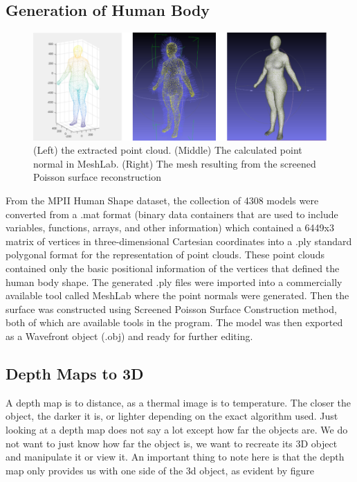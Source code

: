 \documentclass{article}
\begin{document}
    \subsection{Generation of Human Body}
    
    \begin{figure}[h]
        \centering
        \includegraphics{images/humanModel.png}
        \caption{(Left) the extracted point cloud. (Middle) The calculated point normal in MeshLab. (Right) The mesh resulting from the screened Poisson surface reconstruction}
        \label{(Left) the extracted point cloud. (Middle) The calculated point normal in MeshLab. (Right) The mesh resulting from the screened Poisson surface reconstruction(Left) the extracted point cloud. (Middle) The calculated point normal in MeshLab. (Right) The mesh resulting from the screened Poisson surface reconstruction}
    \end{figure}
    From the MPII Human Shape dataset, the collection of 4308 models were converted from a .mat format (binary data containers that are used to include variables, functions, arrays, and other information) which contained a 6449x3 matrix of vertices in three-dimensional Cartesian coordinates into a .ply standard polygonal format for the representation of point clouds. These point clouds contained only the basic positional information of the vertices that defined the human body shape. The generated .ply files were imported into a commercially available tool called MeshLab where the point normals were generated. Then the surface was constructed using Screened Poisson Surface Construction method, both of which are available tools in the program. The model was then exported as a Wavefront object (.obj) and ready for further editing.
    
    \subsection{Depth Maps to 3D}
    
    A depth map is to distance, as a thermal image is to temperature. The closer the object, the darker it is, or lighter depending on the exact algorithm used. Just looking at a depth map does not say a lot except how far the objects are. We do not want to just know how far the object is, we want to recreate its 3D object and manipulate it or view it. An important thing to note here is that the depth map only provides us with one side of the 3d object, as evident by figure 
\end{document}
